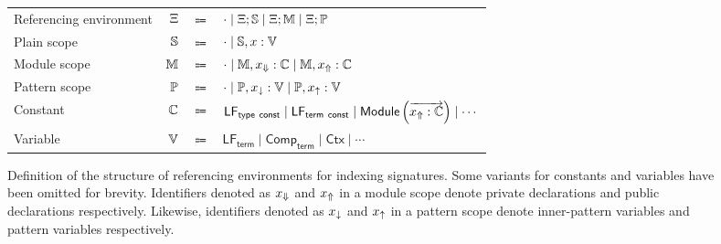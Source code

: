 \begin{figure}[htb]
\centering
\begin{tabular}{lrcl}
Referencing environment & $\Xi$ & $\Coloneqq$ & $\cdot \mid \Xi; \mathbb{S} \mid \Xi; \mathbb{M} \mid \Xi; \mathbb{P}$\\
Plain scope & $\mathbb{S}$ & $\Coloneqq$ & $\cdot \mid \mathbb{S}, x : \mathbb{V}$\\
Module scope & $\mathbb{M}$ & $\Coloneqq$ & $\cdot \mid \mathbb{M}, x_\Downarrow : \mathbb{C} \mid \mathbb{M}, x_\Uparrow : \mathbb{C}$\\
Pattern scope & $\mathbb{P}$ & $\Coloneqq$ & $\cdot \mid \mathbb{P}, x_\downarrow : \mathbb{V} \mid \mathbb{P}, x_\uparrow : \mathbb{V}$\\
Constant & $ \mathbb{C} $ & $ \Coloneqq $ & $\mathsf{LF}_{\mathsf{type\ const}} \mid \mathsf{LF}_{\mathsf{term\ const}} \mid \mathsf{Module}\left(\overrightarrow{x_\Uparrow : \mathbb{C}}\right) \mid \cdots$\\
Variable & $ \mathbb{V} $ & $ \Coloneqq $ & $ \mathsf{LF}_{\mathsf{term}} \mid \mathsf{Comp}_{\mathsf{term}} \mid \mathsf{Ctx} \mid \cdots $
\end{tabular}
\caption[Definition of referencing environments for indexing \Beluga signatures]{%
Definition of the structure of referencing environments for indexing \Beluga signatures.
Some variants for constants and variables have been omitted for brevity.
Identifiers denoted as $x_\Downarrow$ and $x_\Uparrow$ in a module scope denote private declarations and public declarations respectively.
Likewise, identifiers denoted as $x_\downarrow$ and $x_\uparrow$ in a pattern scope denote inner-pattern variables and pattern variables respectively.
}
\label{figure:referencing-environment-definition}
\end{figure}

